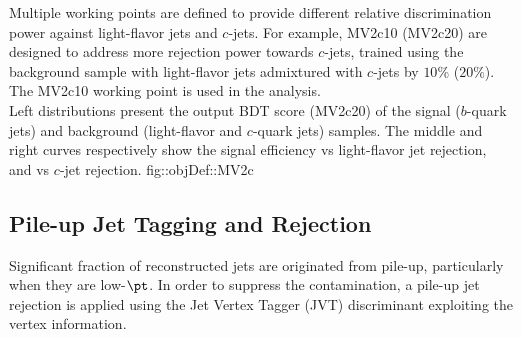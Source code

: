 Multiple working points are defined to provide different relative discrimination power against light-flavor jets and $c$-jets.
For example, MV2c10 (MV2c20) are designed to address more rejection power towards $c$-jets, trained using the background sample with light-flavor jets admixtured with $c$-jets by $10\%$ ($20\%$). 
The MV2c10 working point is used in the analysis. \\






{Left distributions present the output BDT score (MV2c20) of the signal ($b$-quark jets) and background (light-flavor and $c$-quark jets) samples. The middle and right curves respectively show the signal efficiency vs light-flavor jet rejection, and vs $c$-jet rejection.
 \cite{150_bTag_Run2_exp}}
{fig::objDef::MV2c}




\subsection{Pile-up Jet Tagging and Rejection} \label{sec::objDef::jets::JVT}
\newcommand{\pv}{\mathrm{PV}}
\newcommand{\pttk}{\pt^{\mathrm{trk}_k}}
\newcommand{\pttl}{\pt^{\mathrm{trk}_l}}
Significant fraction of reconstructed jets are originated from pile-up, particularly when they are low-$\pt$.
In order to suppress the contamination, a pile-up jet rejection is applied using the Jet Vertex Tagger (JVT) discriminant \cite{155_JVT} exploiting the vertex information.  \\

